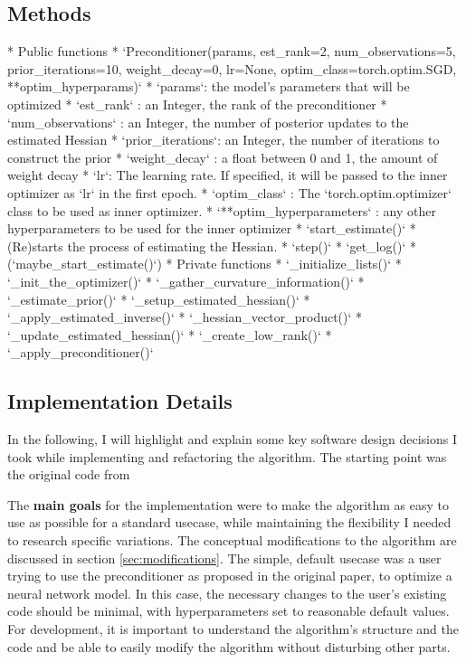 \documentclass[twoside,12pt,a4paper]{report}
\begin{document}
\subsection{Methods}
\begin{markdown}
* Public functions
	* `Preconditioner(params, est_rank=2, num_observations=5, prior_iterations=10, weight_decay=0, lr=None,
	optim_class=torch.optim.SGD, **optim_hyperparams)`
		* `params`: the model's parameters that will be optimized
		* `est_rank` : an Integer, the rank of the preconditioner
		* `num_observations` : an Integer, the number of posterior updates to the estimated Hessian
		* `prior_iterations`: an Integer, the number of iterations to construct the prior
		* `weight_decay` : a float between 0 and 1, the amount of weight decay
		* `lr`: The learning rate. If specified, it will be passed to the inner optimizer as `lr` in the first epoch.
		* `optim_class` : The `torch.optim.optimizer` class to be used as inner optimizer.
		* `**optim_hyperparameters` : any other hyperparameters to be used for the inner optimizer
	* `start_estimate()`
		* (Re)starts the process of estimating the Hessian.
	* `step()`
	* `get_log()`
	* (`maybe_start_estimate()`)
* Private functions
	* `_initialize_lists()`
	* `_init_the_optimizer()`
	* `_gather_curvature_information()`
	* `_estimate_prior()`
	* `_setup_estimated_hessian()`
	* `_apply_estimated_inverse()`
	* `_hessian_vector_product()`
	* `_update_estimated_hessian()`
	* `_create_low_rank()`
	* `_apply_preconditioner()`
	
\end{markdown}
\subsection{Implementation Details} \label{sec:implementation}
In the following, I will highlight and explain some key software design decisions I took while implementing and refactoring the algorithm. The starting point was the original code from \cite{roos2019active}

The \textbf{main goals} for the implementation were to make the algorithm as easy to use as possible for a standard usecase, while maintaining the flexibility I needed to research specific variations. The conceptual modifications to the algorithm are discussed in section \ref{sec:modifications}. The simple, default usecase was a user trying to use the preconditioner as proposed in the original paper, to optimize a neural network model. In this case, the necessary changes to the user's existing code should be minimal, with hyperparameters set to reasonable default values. For development, it is important to understand the algorithm's structure and the code and be able to easily modify the algorithm without disturbing other parts.
\end{document}
